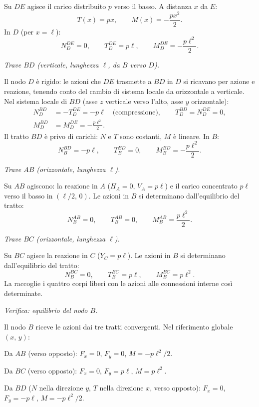 Su $DE$ agisce il carico distribuito $p$
verso il basso. A distanza $x$ da $E$:
\[
T(x) = px, \qquad M(x) = -\frac{px^2}{2}.
\]
In $D$ (per $x = \ell$):
\[
N_D^{DE} = 0, \qquad
T_D^{DE} = p\ell, \qquad
M_D^{DE} = -\frac{p\ell^2}{2}.
\]

\medskip
\noindent\textit{Trave $BD$ (verticale,
	lunghezza $\ell$, da $B$ verso $D$).}

Il nodo $D$ è rigido: le azioni che $DE$
trasmette a $BD$ in $D$ si ricavano per
azione e reazione, tenendo conto del cambio
di sistema locale da orizzontale a verticale.
Nel sistema locale di $BD$ (asse $z$ verticale
verso l'alto, asse $y$ orizzontale):
\[
\begin{aligned}
	N_D^{BD} &= -T_D^{DE} = -p\ell
	\quad\text{(compressione)},
	\qquad
	T_D^{BD} = N_D^{DE} = 0,\\[4pt]
	M_D^{BD} &= M_D^{DE} = -\frac{p\ell^2}{2}.
\end{aligned}
\]
Il tratto $BD$ è privo di carichi: $N$ e $T$
sono costanti, $M$ è lineare. In $B$:
\[
N_B^{BD} = -p\ell, \qquad
T_B^{BD} = 0, \qquad
M_B^{BD} = -\frac{p\ell^2}{2}.
\]

\medskip
\noindent\textit{Trave $AB$ (orizzontale,
	lunghezza $\ell$).}

Su $AB$ agiscono: la reazione in $A$
($H_A = 0$, $V_A = p\ell$) e il carico
concentrato $p\ell$ verso il basso in
$(\ell/2,\,0)$. Le azioni in $B$ si
determinano dall'equilibrio del tratto:
\[
N_B^{AB} = 0, \qquad
T_B^{AB} = 0, \qquad
M_B^{AB} = \frac{p\ell^2}{2}.
\]

\medskip
\noindent\textit{Trave $BC$ (orizzontale,
	lunghezza $\ell$).}

Su $BC$ agisce la reazione in $C$
($Y_C = p\ell$). Le azioni in $B$ si
determinano dall'equilibrio del tratto:
\[
N_B^{BC} = 0, \qquad
T_B^{BC} = p\ell, \qquad
M_B^{BC} = p\ell^2.
\]
La  raccoglie
i quattro corpi liberi con le azioni alle
connessioni interne così determinate.

\medskip
\noindent\textit{Verifica: equilibrio del nodo $B$.}

\noindent Il nodo $B$ riceve le azioni dai tre tratti
convergenti. Nel riferimento globale $(x,\,y)$:

\noindent Da $AB$ (verso opposto):
$F_x = 0$, $F_y = 0$, $M = -p\ell^2/2$.

\noindent Da $BC$ (verso opposto):
$F_x = 0$, $F_y = p\ell$, $M = p\ell^2$.

\noindent Da $BD$ ($N$ nella direzione $y$,
$T$ nella direzione $x$, verso opposto):
$F_x = 0$, $F_y = -p\ell$, $M = -p\ell^2/2$.

